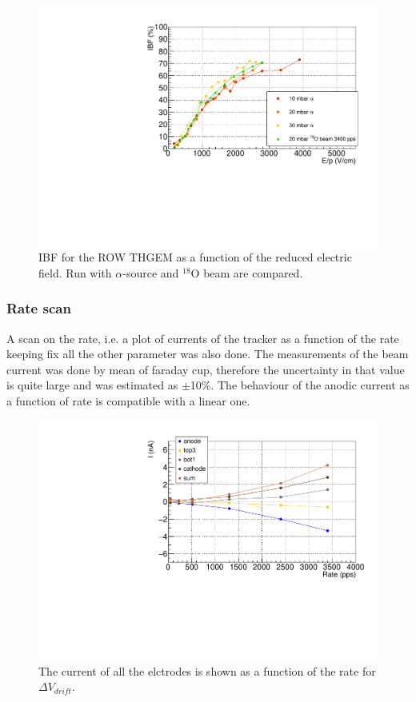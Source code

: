 \documentclass[a4paper, 11 pt]{report}
\newcommand{\Vdrift}{$ \Delta V_{drift}$}
\begin{document}
  \begin{figure}[htbp]
	\centering
	\includegraphics[width=\textwidth]{Immagini/IBF_ROW_Comparison_F_1.pdf}
	\caption{IBF for the ROW THGEM as a function of the reduced electric field. Run with 
	$\alpha$-source	and $^{18}$O beam are compared.}
	\label{fig:IBF_ROW_beam_F}
  \end{figure}

\clearpage
  \subsubsection{Rate scan}  

  A scan on the rate, i.e. a plot of currents of the tracker as a function of the 
  rate keeping fix all the other parameter was also done.
  The measurements of the beam current was done by mean of faraday cup, therefore
  the uncertainty in that value is quite large and was estimated as $\pm$10\%.
  The behaviour of the anodic current as a function of rate is compatible with
  a linear one.

  \begin{figure}[htbp]
	\centering
	\includegraphics[width=\textwidth]{Immagini/Rate_ROW_1000V.pdf}
	\caption{The current of all the elctrodes is shown as a function of the rate 
	for \Vdrift.}
	\label{fig:Rate_allcurrent_ROW}
  \end{figure}
  
\end{document}
